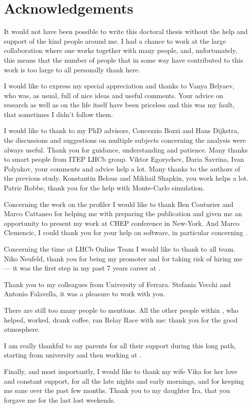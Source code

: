 \chapter*{Acknowledgements}
It would not have been possible to write this doctoral thesis without the help
and support of the kind people around me. I had a chance to work at the large
\lhcb collaboration where one works together with many people, and, unfortunately,
this means that the number of people that in some way have contributed to this
work is too large to all personally thank here.

I would like to express my special appreciation and thanks to Vanya Belyaev,
who was, as usual, full of nice ideas and useful comments. Your advice on
research as well as on the life itself have been priceless and this was my
fault, that sometimes I didn't follow them.

I would like to thank to my PhD advisors, Concezzio Bozzi and Hans Dijkstra,
the discussions and suggestions on multiple subjects concerning the analysis
were always useful. Thank you for guidance, understanding and patience.
Many thanks to smart people from ITEP LHCb group. Viktor Egorychev, Daria Savrina,
Ivan Polyakov, your comments and advice help a lot. Many thanks to the authors
of the previous \chib study. Konstantin Belous and Mikhail Shapkin, you work
helps a lot. Patric Robbe, thank  you for the help with Monte-Carlo simulation.


Concerning the work on the profiler I would like to thank Ben Couturier and
Marco Cattaneo for helping me with preparing the publication and given me an
opportunity to present my work at CHEP conference in New-York. And Marco
Clemencic, I could thank you for your help on software, in particular
concerning \gaudi.

Concerning the time at LHCb Online Team I would like to thank to all
team. Niko Neufeld, thank you for being my promoter and for taking risk of 
hiring me --- it was the first step in my past 7 years career at \cern.

Thank you to my colleagues from University of Ferrara. Stefania Vecchi and
Antonio Falavella, it was a pleasure to work with you.

There are still too many people to mentions. All the other people within \lhcb,
who helped, worked, drank coffee, ran Relay Race with me: thank you for the
good atmosphere.

I am really thankful to my parents for all their support during this long path,
starting from university and then working at \cern.

Finally, and most importantly, I would like to thank my wife Vika for her love
and constant support, for all the late nights and early mornings, and for
keeping me sane over the past few months. Thank you to my daughter Ira, that  you
forgave me for the last lost weekends.


